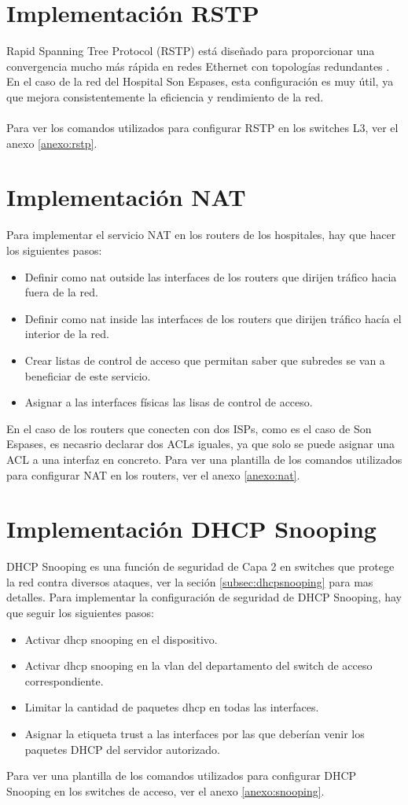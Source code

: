 \section{Implementación RSTP}
Rapid Spanning Tree Protocol (RSTP) está diseñado para proporcionar una convergencia mucho más rápida en redes Ethernet con topologías redundantes \cite{cisco_rstp_8021w}. En el caso de la red del Hospital Son Espases, esta configuración es muy útil, ya que mejora consistentemente la eficiencia y rendimiento de la red.
\\ \\
Para ver los comandos utilizados para configurar RSTP en los switches L3, ver el anexo \ref{anexo:rstp}.
\section{Implementación NAT}
Para implementar el servicio NAT en los routers de los hospitales, hay que hacer los siguientes pasos:
\begin{itemize}
    \item Definir como nat outside las interfaces de los routers que dirijen tráfico hacia fuera de la red.
    \item Definir como nat inside las interfaces de los routers que dirijen tráfico hacía el interior de la red.
    \item Crear listas de control de acceso que permitan saber que subredes se van a beneficiar de este servicio.
    \item Asignar a las interfaces físicas las lisas de control de acceso.
\end{itemize}
En el caso de los routers que conecten con dos ISPs, como es el caso de Son Espases, es necasrio declarar dos ACLs iguales, ya que solo se puede asignar una ACL a una interfaz en concreto.
Para ver una plantilla de los comandos utilizados para configurar NAT en los routers, ver el anexo \ref{anexo:nat}.
\section{Implementación DHCP Snooping}
DHCP Snooping es una función de seguridad de Capa 2 en switches que protege la red contra diversos ataques, ver la seción \ref{subsec:dhcpsnooping} para mas detalles. Para implementar la configuración de seguridad de DHCP Snooping, hay que seguir los siguientes pasos:
\begin{itemize}
    \item Activar dhcp snooping en el dispositivo.
    \item Activar dhcp snooping en la vlan del departamento del switch de acceso correspondiente.
    \item Limitar la cantidad de paquetes dhcp en todas las interfaces.
    \item Asignar la etiqueta trust a las interfaces por las que deberían venir los paquetes DHCP del servidor autorizado.
\end{itemize}
Para ver una plantilla de los comandos utilizados para configurar DHCP Snooping en los switches de acceso, ver el anexo \ref{anexo:snooping}.
